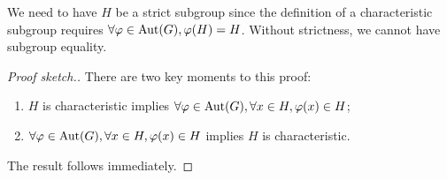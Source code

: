 \begin{thm-remark}
We need to have $H$ be a strict subgroup since the definition of a
characteristic subgroup requires $\forall\varphi\in\operatorname{Aut}(G),\varphi(H)=H$.
Without strictness, we cannot have subgroup equality.
\end{thm-remark}

\begin{proof}[Proof sketch.]
There are two key moments to this proof:
\begin{enumerate}
\item $H$ is characteristic implies $\forall\varphi\in\operatorname{Aut}(G),\forall x\in H,\varphi(x)\in H$;
\item $\forall\varphi\in\operatorname{Aut}(G),\forall x\in H,\varphi(x)\in H$ implies $H$ is characteristic.
\end{enumerate}
The result follows immediately.
\end{proof}

